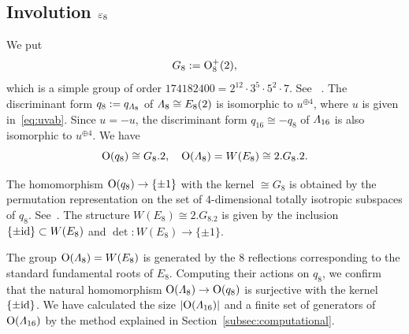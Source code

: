 \documentclass{amsart} %
\begin{document}
\subsection{Involution $\varepsilon_8$}\label{subsec:vep8}
%
We put
\[
G_8:=\mathord{\mathrm{O}}^+_8(2), 
\]
which is a simple group of order $174182400=2^{12} \cdot 3^5\cdot 5^2\cdot 7$.
See ~\cite[page 85]{MR827219}.
%
%
The discriminant form $q_8:=q_{\varLambda_8}$ of $ \varLambda_{8}\cong E_8(2)$ 
is isomorphic to $u^{\oplus 4}$,
where $u$  is given in~\eqref{eq:uvab}.
Since $u= -u$, 
the discriminant form $q_{16}\cong -q_8$ of $ \varLambda_{16}$ is also  isomorphic to 
$u^{\oplus 4}$.
We have
\[
\mathord{\mathrm{O}}(q_8)\cong G_8.2, 
\quad 
\mathord{\mathrm{O}}(\varLambda_8)=W(E_8)\cong 2.G_8.2.
\]
%
\begin{remark}\label{rem:2G2}
The homomorphism $\mathord{\mathrm{O}}(q_8)\to \{\pm 1\}$ %
with the kernel $\cong G_8$
is obtained by the permutation representation on
 the set of $4$-dimensional totally isotropic subspaces of 
$q_8$.
See~\cite[Section 3.8]{Wilson2009}.
The structure $W(E_8)\cong 2.G_8.2$ is given by
the inclusion $\{\pm \mathord{\mathrm{id}}\}\subset W(E_8)$ and $\det\colon W(E_8)\to \{\pm 1\}$.
\end{remark}
%
The group $\mathord{\mathrm{O}}(\varLambda_8)=W(E_8)$
is generated by the $8$ reflections
corresponding to the standard fundamental roots of $E_8$.
Computing their actions on  $q_8$,
we confirm that 
 the natural homomorphism $\mathord{\mathrm{O}}(\varLambda_8)\to \mathord{\mathrm{O}}(q_8)$ is surjective
with the kernel $\{\pm \mathord{\mathrm{id}}\}$.
We have calculated the size $|\mathord{\mathrm{O}}(\varLambda_{16})|$ and a finite set of generators of $ \mathord{\mathrm{O}}(\varLambda_{16})$
by the method 
explained in Section~\ref{subsec:computational}.
% 
\end{document}
